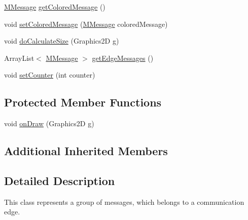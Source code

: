 \begin{DoxyCompactItemize}
\item 
\hyperlink{classorg_1_1tzi_1_1use_1_1gui_1_1views_1_1diagrams_1_1behavior_1_1communicationdiagram_1_1_m_message}{M\-Message} \hyperlink{classorg_1_1tzi_1_1use_1_1gui_1_1views_1_1diagrams_1_1behavior_1_1communicationdiagram_1_1_messages_group_ae143128ca410c0d694c2f9bcffb4a29c}{get\-Colored\-Message} ()
\item 
void \hyperlink{classorg_1_1tzi_1_1use_1_1gui_1_1views_1_1diagrams_1_1behavior_1_1communicationdiagram_1_1_messages_group_a4e21cbc1b6f02168b1262df42d28c2af}{set\-Colored\-Message} (\hyperlink{classorg_1_1tzi_1_1use_1_1gui_1_1views_1_1diagrams_1_1behavior_1_1communicationdiagram_1_1_m_message}{M\-Message} colored\-Message)
\item 
void \hyperlink{classorg_1_1tzi_1_1use_1_1gui_1_1views_1_1diagrams_1_1behavior_1_1communicationdiagram_1_1_messages_group_a70de9df73876350fc3df10b3b80038ee}{do\-Calculate\-Size} (Graphics2\-D g)
\item 
Array\-List$<$ \hyperlink{classorg_1_1tzi_1_1use_1_1gui_1_1views_1_1diagrams_1_1behavior_1_1communicationdiagram_1_1_m_message}{M\-Message} $>$ \hyperlink{classorg_1_1tzi_1_1use_1_1gui_1_1views_1_1diagrams_1_1behavior_1_1communicationdiagram_1_1_messages_group_aac199398033989697c0c7f0e83e488ab}{get\-Edge\-Messages} ()
\item 
void \hyperlink{classorg_1_1tzi_1_1use_1_1gui_1_1views_1_1diagrams_1_1behavior_1_1communicationdiagram_1_1_messages_group_aa0717f9c39210f00f05c47f87c8d537c}{set\-Counter} (int counter)
\end{DoxyCompactItemize}
\subsection*{Protected Member Functions}
\begin{DoxyCompactItemize}
\item 
void \hyperlink{classorg_1_1tzi_1_1use_1_1gui_1_1views_1_1diagrams_1_1behavior_1_1communicationdiagram_1_1_messages_group_a95859e1130eade690cb5a31522b50fcc}{on\-Draw} (Graphics2\-D g)
\end{DoxyCompactItemize}
\subsection*{Additional Inherited Members}


\subsection{Detailed Description}
This class represents a group of messages, which belongs to a communication edge.

